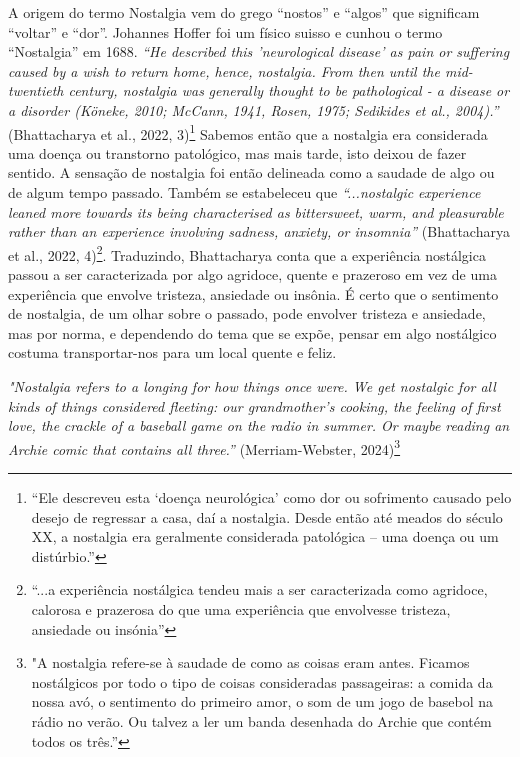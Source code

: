 \documentclass{article}
\begin{document}
A origem do termo Nostalgia vem do grego “nostos” e “algos” que significam 
“voltar” e “dor”. Johannes Hoffer foi um físico suisso e cunhou o termo “Nostalgia” em 
1688. \textit{“He described this 'neurological disease' as pain or suffering caused by a wish to }
\textit{return home, hence, nostalgia. From then until the mid-twentieth century, nostalgia was }
\textit{generally thought to be pathological - a disease or a disorder (Köneke, 2010; McCann, }
\textit{1941,  Rosen,  1975;  Sedikides  et  al.,  2004).”} (Bhattacharya  et  al.,  2022,  3)\footnote{“Ele descreveu esta ‘doença neurológica’ como dor ou sofrimento causado pelo desejo de regressar a casa, daí a nostalgia. Desde então até meados do século XX, a nostalgia era geralmente considerada patológica – uma doença ou um distúrbio.” }  Sabemos 
então que a nostalgia era considerada uma doença ou transtorno patológico, mas mais 
tarde, isto deixou de fazer sentido. A sensação de nostalgia foi então delineada como a 
saudade de algo ou de algum tempo passado. Também se estabeleceu que \textit{“...nostalgic }
\textit{experience  leaned  more  towards  its  being  characterised  as  bittersweet,  warm,  and }
\textit{pleasurable  rather  than  an  experience  involving  sadness,  anxiety,  or  insomnia”} 
(Bhattacharya  et  al.,  2022,  4)\footnote{“...a experiência nostálgica tendeu mais a ser caracterizada como agridoce, calorosa e prazerosa do que uma experiência que envolvesse tristeza, ansiedade ou insónia” }.  Traduzindo,  Bhattacharya  conta  que  a  experiência 
nostálgica passou a ser caracterizada por algo agridoce, quente e prazeroso em vez de 
uma experiência que envolve tristeza, ansiedade ou insônia. É certo que o sentimento de 
nostalgia,  de  um  olhar  sobre  o  passado,  pode  envolver  tristeza  e  ansiedade,  mas  por 
norma,  e  dependendo  do  tema  que  se  expõe,  pensar  em  algo  nostálgico  costuma 
transportar-nos para um local quente e feliz.  
 
 
 
 
 



 



\textit{"Nostalgia refers to a longing for how things once were. We get nostalgic for all kinds }
\textit{of things considered fleeting: our grandmother's cooking, the feeling of first love, the }
\textit{crackle of a baseball game on the radio in summer. Or maybe reading an Archie comic }
\textit{that contains all three.”} (Merriam-Webster, 2024)\footnote{"A nostalgia refere-se à saudade de como as coisas eram antes. Ficamos nostálgicos por todo o tipo de coisas consideradas passageiras: a comida da nossa avó, o sentimento do primeiro amor, o som de um jogo de basebol na rádio no verão. Ou talvez a ler um banda desenhada do Archie que contém todos os três.” }
 
\end{document}
